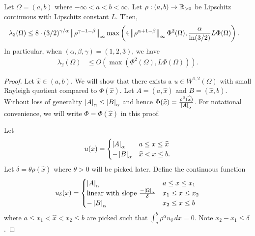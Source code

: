 \begin{theorem}
\label{thm:buser_1}
Let $\Omega = (a,b)$ where $-\infty<a<b<\infty$. Let $\rho:(a,b)\to\mathbb{R}_{>0}$ be Lipschitz continuous with Lipschitz constant $L$. Then,
\begin{align*}
\lambda_2(\Omega) &\leq 8\cdot (3/2)^{\gamma/\alpha} \left\lVert \rho^{\gamma -1 - \beta} \right\rVert_\infty \max\left(4\left\lVert \rho^{\alpha+1-\beta} \right\rVert_\infty \Phi^2(\Omega), \frac{\alpha}{\ln(3/2)}L\Phi(\Omega)\right).
\end{align*}
In particular, when $(\alpha,\beta,\gamma) = (1,2,3)$, we have
\begin{align*}
\lambda_2(\Omega) &\leq O\left(\max\left(\Phi^2(\Omega), L\Phi(\Omega)\right)\right).
\end{align*}
\end{theorem}
\begin{proof}
Let $\hat x\in(a,b)$. We will show that there exists a $u\in W^{1,2}(\Omega)$ with small Rayleigh quotient compared to $\Phi(\hat x)$.
Let $A = (a,\hat x)$ and $B = (\hat x, b)$. Without loss of generality $\left| A \right|_\alpha \leq \left| B \right|_\alpha$ and hence $\Phi(\widehat x) = \frac{\rho^\beta (\widehat x)}{\left| A \right|_\alpha}$. For notational convenience, we will write $\Phi = \Phi(\hat x)$ in this proof.

Let
\begin{align*}
u(x) = \begin{cases}
	\left| A \right|_\alpha & a \leq x \leq \widehat x\\
	-\left| B \right|_\alpha & \widehat x < x\leq b.
\end{cases}
\end{align*}
Let $\delta=\theta \rho(\hat x)$ where $\theta>0$ will be picked later. Define the continuous function
\begin{align*}
u_\delta(x) = \begin{cases}
	\left| A \right|_\alpha & a \leq x \leq x_1\\
	\text{linear with slope }\frac{-\left| \Omega \right|_\alpha}{\delta} & x_1 \leq x \leq x_2\\
	-\left| B \right|_\alpha & x_2 \leq x \leq b
\end{cases}
\end{align*}
where $a\leq x_1<\hat x< x_2\leq b$ are picked such that $\int_a^b \rho^\alpha u_\delta\,dx = 0$. Note $x_2 - x_1\leq \delta$.


\end{proof}
